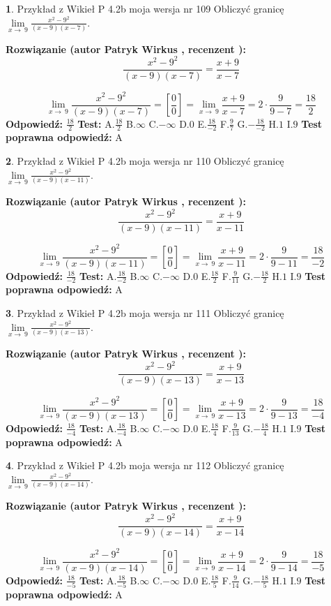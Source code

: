 \documentclass[12pt, a4paper]{article}
\theoremstyle{definition} %
\newtheorem{zad}{}
\newcommand{\zadStart}[1]{\begin{zad}#1\newline}
\newcommand{\zadStop}{\end{zad}}
\newcommand{\rozwStart}[2]{\noindent \textbf{Rozwiązanie (autor #1 , recenzent #2): }\newline}
\newcommand{\rozwStop}{\newline}
\newcommand{\odpStart}{\noindent \textbf{Odpowiedź:}\newline}
\newcommand{\odpStop}{\newline}
\newcommand{\testStart}{\noindent \textbf{Test:}\newline}
\newcommand{\testStop}{\newline}
\newcommand{\kluczStart}{\noindent \textbf{Test poprawna odpowiedź:}\newline}
\newcommand{\kluczStop}{\newline}
\begin{document}
\zadStart{Przykład z Wikieł P 4.2b moja wersja nr 109}
Obliczyć granicę $\lim\limits_{x\to\ 9}\frac{x^{2}-9^{2}}{(x-9)(x-7)}$.
\zadStop
\rozwStart{Patryk Wirkus}{}
$$\frac{x^{2}-9^{2}}{(x-9)(x-7)}=\frac{x+9}{x-7}$$

$$\lim\limits_{x\to\ 9}\frac{x^{2}-9^{2}}{(x-9)(x-7)}=[\frac{0}{0}]=\lim\limits_{x\to\ 9}\frac{x+9}{x-7}=2 \cdot \frac{9}{9-7} = \frac{18}{2}$$
\rozwStop
\odpStart
$\frac{18}{2}$
\odpStop
\testStart
A.$\frac{18}{2}$
B.$\infty$
C.$-\infty$
D.$0$
E.$\frac{18}{-2}$
F.$\frac{9}{7}$
G.$-\frac{18}{-2}$
H.$1$
I.$9$
\testStop
\kluczStart
A
\kluczStop



\zadStart{Przykład z Wikieł P 4.2b moja wersja nr 110}
Obliczyć granicę $\lim\limits_{x\to\ 9}\frac{x^{2}-9^{2}}{(x-9)(x-11)}$.
\zadStop
\rozwStart{Patryk Wirkus}{}
$$\frac{x^{2}-9^{2}}{(x-9)(x-11)}=\frac{x+9}{x-11}$$

$$\lim\limits_{x\to\ 9}\frac{x^{2}-9^{2}}{(x-9)(x-11)}=[\frac{0}{0}]=\lim\limits_{x\to\ 9}\frac{x+9}{x-11}=2 \cdot \frac{9}{9-11} = \frac{18}{-2}$$
\rozwStop
\odpStart
$\frac{18}{-2}$
\odpStop
\testStart
A.$\frac{18}{-2}$
B.$\infty$
C.$-\infty$
D.$0$
E.$\frac{18}{2}$
F.$\frac{9}{11}$
G.$-\frac{18}{2}$
H.$1$
I.$9$
\testStop
\kluczStart
A
\kluczStop



\zadStart{Przykład z Wikieł P 4.2b moja wersja nr 111}
Obliczyć granicę $\lim\limits_{x\to\ 9}\frac{x^{2}-9^{2}}{(x-9)(x-13)}$.
\zadStop
\rozwStart{Patryk Wirkus}{}
$$\frac{x^{2}-9^{2}}{(x-9)(x-13)}=\frac{x+9}{x-13}$$

$$\lim\limits_{x\to\ 9}\frac{x^{2}-9^{2}}{(x-9)(x-13)}=[\frac{0}{0}]=\lim\limits_{x\to\ 9}\frac{x+9}{x-13}=2 \cdot \frac{9}{9-13} = \frac{18}{-4}$$
\rozwStop
\odpStart
$\frac{18}{-4}$
\odpStop
\testStart
A.$\frac{18}{-4}$
B.$\infty$
C.$-\infty$
D.$0$
E.$\frac{18}{4}$
F.$\frac{9}{13}$
G.$-\frac{18}{4}$
H.$1$
I.$9$
\testStop
\kluczStart
A
\kluczStop



\zadStart{Przykład z Wikieł P 4.2b moja wersja nr 112}
Obliczyć granicę $\lim\limits_{x\to\ 9}\frac{x^{2}-9^{2}}{(x-9)(x-14)}$.
\zadStop
\rozwStart{Patryk Wirkus}{}
$$\frac{x^{2}-9^{2}}{(x-9)(x-14)}=\frac{x+9}{x-14}$$

$$\lim\limits_{x\to\ 9}\frac{x^{2}-9^{2}}{(x-9)(x-14)}=[\frac{0}{0}]=\lim\limits_{x\to\ 9}\frac{x+9}{x-14}=2 \cdot \frac{9}{9-14} = \frac{18}{-5}$$
\rozwStop
\odpStart
$\frac{18}{-5}$
\odpStop
\testStart
A.$\frac{18}{-5}$
B.$\infty$
C.$-\infty$
D.$0$
E.$\frac{18}{5}$
F.$\frac{9}{14}$
G.$-\frac{18}{5}$
H.$1$
I.$9$
\testStop
\kluczStart
A
\kluczStop
\end{document}

